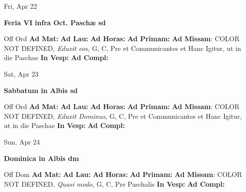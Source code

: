 \documentclass[10pt]{memoir}
\begin{document}
\begin{center}
\begin{minipage}{3.5in}
\vspace{2em}
\begin{center}Fri, Apr 22
\end{center}
\textbf{ \large Feria VI infra Oct. Paschæ
\textnormal{\normalsize sd}}

\begin{justify}Off Ord
\textbf{Ad Mat: }
\textbf{Ad Lau: }
\textbf{Ad Horas: }
\textbf{Ad Primam: }\textbf{Ad Missam}: COLOR NOT DEFINED, \textit{Eduxit eos,} G, C, Pre et Communicantes et Hanc Igitur, ut in die Paschae
\textbf{In Vesp: }
\textbf{Ad Compl: }
\end{justify}
\end{minipage}
\end{center}

\begin{center}
\begin{minipage}{3.5in}
\vspace{2em}
\begin{center}Sat, Apr 23
\end{center}
\textbf{ \large Sabbatum in Albis
\textnormal{\normalsize sd}}

\begin{justify}Off Ord
\textbf{Ad Mat: }
\textbf{Ad Lau: }
\textbf{Ad Horas: }
\textbf{Ad Primam: }\textbf{Ad Missam}: COLOR NOT DEFINED, \textit{Eduxit Dominus,} G, C, Pre et Communicantes et Hanc Igitur, ut in die Paschae
\textbf{In Vesp: }
\textbf{Ad Compl: }
\end{justify}
\end{minipage}
\end{center}

\begin{center}
\begin{minipage}{3.5in}
\vspace{2em}
\begin{center}Sun, Apr 24
\end{center}
\textbf{ \large Dominica in Albis
\textnormal{\normalsize dm}}

\begin{justify}Off Dom
\textbf{Ad Mat: }
\textbf{Ad Lau: }
\textbf{Ad Horas: }
\textbf{Ad Primam: }\textbf{Ad Missam}: COLOR NOT DEFINED, \textit{Quasi modo,} G, C, Pre Paschalis
\textbf{In Vesp: }
\textbf{Ad Compl: }
\end{justify}
\end{minipage}
\end{center}
\end{document}
